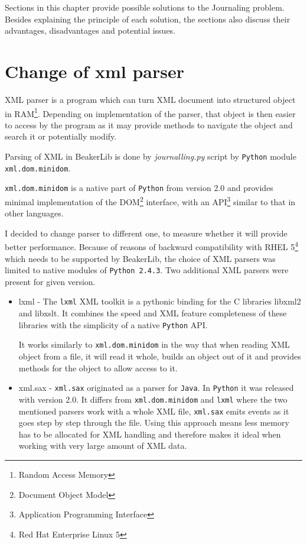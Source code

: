Sections in this chapter provide possible solutions to the Journaling problem. Besides explaining the principle of each solution, the sections also discuss their advantages, disadvantages and potential issues.

\section{Change of xml parser}
XML parser is a program which can turn XML document into structured object in RAM\footnote{Random Access Memory}. Depending on implementation of the parser, that object is then easier to access by the program as it may provide methods to navigate the object and search it or potentially modify. 

Parsing of XML in BeakerLib is done by \textit{journalling.py} script by \texttt{Python} module \texttt{xml.dom.minidom}\cite{minidom_doc}. 

 \texttt{xml.dom.minidom} is a native part of \texttt{Python} from version 2.0 and provides minimal implementation of the DOM\footnote{Document Object Model} interface, with an API\footnote{Application Programming Interface} similar to that in other languages. 

I decided to change parser to different one, to measure whether it will provide better performance. Because of reasons of backward compatibility with RHEL 5\footnote{Red Hat Enterprise Linux 5} which needs to be supported by BeakerLib, the choice of XML parsers was limited to native modules of \texttt{Python 2.4.3}. Two additional XML parsers were present for given version.

\begin{itemize}
\item lxml - The \texttt{lxml} XML toolkit is a pythonic binding for the C libraries libxml2 and libxslt. It combines the speed and XML feature completeness of these libraries with the simplicity of a native \texttt{Python} API\cite{lxml_doc}.

It works similarly to \texttt{xml.dom.minidom} in the way that when reading XML object from a file, it will read it whole, builds an object out of it and provides methods for the object to allow access to it.
\item xml.sax  \cite{sax_doc} - \texttt{xml.sax} originated as a parser for \texttt{Java}\cite{Sax2}. In \texttt{Python} it was released with version 2.0. It differs from \texttt{xml.dom.minidom} and \texttt{lxml} where the two mentioned parsers work with a whole XML file,  \texttt{xml.sax} emits events as it goes step by step through the file\cite{sax_example}. Using this approach means less memory has to be allocated for XML handling and therefore makes it ideal when working with very large amount of XML  data.
\end{itemize}

